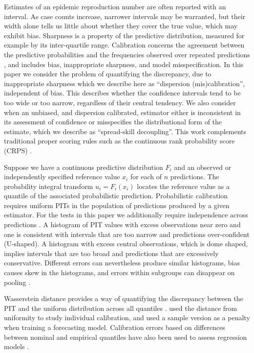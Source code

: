 \documentclass[twoside,11pt,hyphens]{article}
\begin{document}
Estimates of an epidemic reproduction number are often reported with an interval. As case counts increase, narrower intervals may be warranted, but their width alone tells us little about whether they cover the true value, which may exhibit bias. Sharpness is a property of the predictive distribution, measured for example by its inter-quartile range. Calibration concerns the agreement between the predictive probabilities and the frequencies observed over repeated predictions \citep{degroot1983,gneiting2007}, and includes bias, inappropriate sharpness, and model misspecification. In this paper we consider the problem of quantifying the discrepancy, due to inappropriate sharpness which we describe here as ``dispersion (mis)calibration'', independent of bias. This describes whether the confidence intervals tend to be too wide or too narrow, regardless of their central tendency. We also consider when an unbiased, and dispersion calibrated, estimator either is inconsistent in its assessment of confidence or misspecifies the distributional form of the estimate, which we describe as ``spread-skill decoupling''. This work complements traditional proper scoring rules such as the continuous rank probability score (CRPS) \citep{bosse2023,gneiting2007}.

Suppose we have a continuous predictive distribution $F_i$ and an observed or independently specified reference value $x_i$ for each of $n$ predictions. The probability integral transform $u_i=F_i(x_i)$ locates the reference value as a quantile of the associated probabilistic prediction. Probabilistic calibration requires uniform PITs in the population of predictions produced by a given estimator. For the tests in this paper we additionally require independence across predictions \citep{dawid1984,diebold1998}. A histogram of PIT values with excess observations near zero and one is consistent with intervals that are too narrow and predictions over-confident (U-shaped). A histogram with excess central observations, which is dome shaped, implies intervals that are too broad and predictions that are excessively conservative. Different errors can nevertheless produce similar histograms, bias causes skew in the histograms, and errors within subgroups can disappear on pooling \citep{hamill2001}.

Wasserstein distance provides a way of quantifying the discrepancy between the PIT and the uniform distribution across all quantiles \citep{panaretos2019}. \citet{zhao2020} used the distance from uniformity to study individual calibration, and \citet{wessel2025} used a sample version as a penalty when training a forecasting model. Calibration errors based on differences between nominal and empirical quantiles have also been used to assess regression models \citep{kuleshov2018,dheur2023}.
\end{document}

